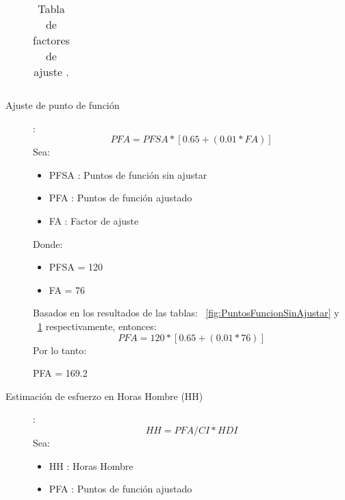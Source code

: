\begin{description}
\begin{longtable}[c]{| >{\centering\arraybackslash}m{8cm} | >{\centering\arraybackslash}m{2cm} |}
                        \caption{Tabla de factores de ajuste .\label{long}}
                        \label{fig:FactoresaAjuste}
                    \end{longtable}
            
                \item [Ajuste de punto de función]:
                    \begin{equation}
                        PFA=PFSA*[0.65+(0.01*FA)] \label{eq:EqAjusteFuncion}
                    \end{equation}
                    Sea:
                    \begin{itemize}
                        \item PFSA : Puntos de función sin ajustar
                        \item PFA : Puntos de función ajustado
                        \item FA : Factor de ajuste
                    \end{itemize}
                    Donde:
                    \begin{itemize}
                        \item PFSA = 120
                        \item FA = 76 
                    \end{itemize}
                    Basados en los resultados de las tablas: ~\ref{fig:PuntosFuncionSinAjustar} y ~\ref{fig:FactoresaAjuste} respectivamente, entonces:
                    \begin{equation}
                        PFA=120*[0.65+(0.01*76)]
                    \end{equation}
                    Por lo tanto:
                    \begin{center}
                        PFA = 169.2
                    \end{center} 
                \item [Estimación de esfuerzo en Horas Hombre (HH)]:
                    \begin{equation}
                        HH = PFA / CI * HDI
                        \label{eq:EqEstimacionEsfuerzoHH}
                    \end{equation}
                    Sea:
                    \begin{itemize}
                        \item HH : Horas Hombre
                        \item PFA : Puntos de función ajustado

\end{itemize}
\end{description}
